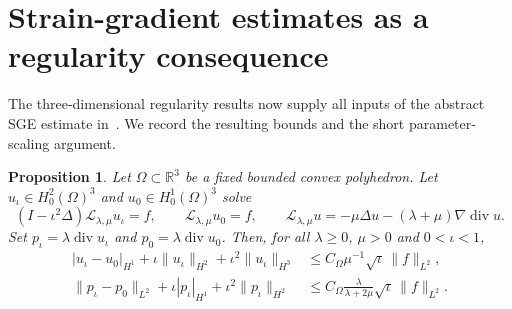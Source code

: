 \documentclass[11pt,a4paper]{article}
\newtheorem{proposition}[theorem]{Proposition}
\theoremstyle{remark}
\numberwithin{equation}{section}
\begin{document}
\section{Strain-gradient estimates as a regularity consequence}
\label{sec:est-sge}

The three-dimensional regularity results now supply all inputs of the
abstract SGE estimate in~\cite[Theorem~3.3]{PolygonCompanion2026}.
We record the resulting bounds and the short parameter-scaling argument.

\begin{proposition}\label{prop:est-sge-transfer}
Let $\Omega\subset\mathbb R^3$ be a fixed bounded convex polyhedron.
Let $u_\iota\in H_0^2(\Omega)^3$ and $u_0\in H_0^1(\Omega)^3$ solve
\[
 (I-\iota^2\Delta)\mathcal L_{\lambda,\mu}u_\iota=f,
 \qquad \mathcal L_{\lambda,\mu}u_0=f,
 \qquad
 \mathcal L_{\lambda,\mu}u=-\mu\Delta u
                     -(\lambda+\mu)\nabla\operatorname{div}u.
\]
Set $p_\iota=\lambda\operatorname{div}u_\iota$ and
$p_0=\lambda\operatorname{div}u_0$. Then, for all
$\lambda\ge0$, $\mu>0$ and $0<\iota<1$,
\begin{align}
 |u_\iota-u_0|_{H^1}+\iota\|u_\iota\|_{H^2}
                  +\iota^2\|u_\iota\|_{H^3}
 &\le C_\Omega\mu^{-1}\sqrt\iota\,\|f\|_{L^2},
 \label{eq:est-sge-u}\\
 \|p_\iota-p_0\|_{L^2}+\iota|p_\iota|_{H^1}
                  +\iota^2\|p_\iota\|_{H^2}
 &\le C_\Omega\frac{\lambda}{\lambda+2\mu}
                    \sqrt\iota\,\|f\|_{L^2}.
 \label{eq:est-sge-p}
\end{align}
\end{proposition}
\end{document}
